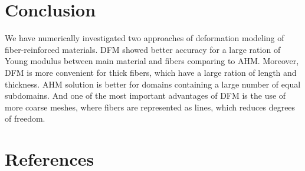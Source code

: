 \documentclass[a4paper]{jpconf}
\begin{document}
\section{Conclusion}
We have numerically investigated two approaches of deformation modeling of fiber-reinforced materials. DFM showed better accuracy for a large ration of Young modulus between main material and fibers comparing to AHM. Moreover, DFM is more convenient for thick fibers, which have a large ration of length and thickness. AHM solution is better for domains containing a large number of equal subdomains. And one of the most important advantages of DFM is the use of more coarse meshes, where fibers are represented as lines, which reduces degrees of freedom.

\section*{References}
\end{document}
